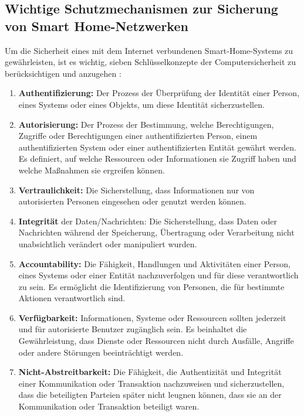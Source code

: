 \subsection{Wichtige Schutzmechanismen zur Sicherung von Smart Home-Netzwerken} 
Um die Sicherheit eines mit dem Internet verbundenen Smart-Home-Systems zu gewährleisten, ist es wichtig, sieben Schlüsselkonzepte der Computersicherheit zu berücksichtigen und anzugehen \cite{khatoun2022cybersecurity}\cite{smys2020hybrid}:
 \begin{enumerate}
     \item \textbf{Authentifizierung:} Der Prozess der Überprüfung der Identität einer Person, eines Systems oder eines Objekts, um diese Identität sicherzustellen.
\item \textbf{Autorisierung:} Der Prozess der Bestimmung, welche Berechtigungen, Zugriffe oder Berechtigungen einer authentifizierten Person, einem authentifizierten System oder einer authentifizierten Entität gewährt werden. Es definiert, auf welche Ressourcen oder Informationen sie Zugriff haben und welche Maßnahmen sie ergreifen können.
\item \textbf{Vertraulichkeit:} Die Sicherstellung, dass Informationen nur von autorisierten Personen eingesehen oder genutzt werden können.

\item \textbf{Integrität} der Daten/Nachrichten: Die Sicherstellung, dass Daten oder Nachrichten während der Speicherung, Übertragung oder Verarbeitung nicht unabsichtlich verändert oder manipuliert wurden.
\item \textbf{Accountability:} Die Fähigkeit, Handlungen und Aktivitäten einer Person, eines Systems oder einer Entität nachzuverfolgen und für diese verantwortlich zu sein. Es ermöglicht die Identifizierung von Personen, die für bestimmte Aktionen verantwortlich sind.
\item \textbf{Verfügbarkeit:} Informationen, Systeme oder Ressourcen sollten jederzeit und für autorisierte Benutzer zugänglich sein. Es beinhaltet die Gewährleistung, dass Dienste oder Ressourcen nicht durch Ausfälle, Angriffe oder andere Störungen beeinträchtigt werden.
\item \textbf{Nicht-Abstreitbarkeit:} Die Fähigkeit, die Authentizität und Integrität einer Kommunikation oder Transaktion nachzuweisen und sicherzustellen, dass die beteiligten Parteien später nicht leugnen können, dass sie an der Kommunikation oder Transaktion beteiligt waren. 
 \end{enumerate}



